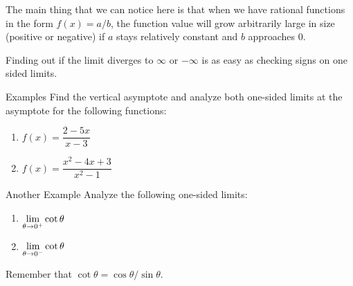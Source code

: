 The main thing that we can notice here is that when we have rational functions in the form $f(x)=a/b$, the function value will grow arbitrarily large in size (positive or negative) if $a$ stays relatively constant and $b$ approaches 0.

Finding out if the limit diverges to $\infty$ or $-\infty$ is as easy as checking signs on one sided limits.

\begin{note}{Examples}
  Find the vertical asymptote and analyze both one-sided limits at the asymptote for the following functions:
  \begin{multicols}{2}
    \begin{enumerate}
      \item $f(x) = \dfrac{2-5x}{x-3}$
      \item $f(x) = \dfrac{x^2-4x+3}{x^2-1}$
    \end{enumerate}
  \end{multicols}
\end{note}

\begin{note}{Another Example}
  Analyze the following one-sided limits:
  \begin{multicols}{2}
    \begin{enumerate}
      \item $\displaystyle \lim_{\theta\to0^+} \cot \theta$
      \item $\displaystyle \lim_{\theta\to0^-} \cot \theta$
    \end{enumerate}
  \end{multicols}
  Remember that $\cot \theta = \cos \theta / \sin \theta$.
\end{note}
